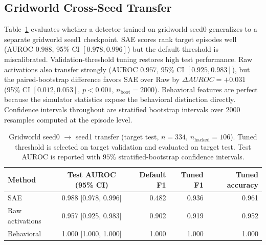 \documentclass[11pt]{article}
\newcommand{\auroc}{AUROC}
\newcommand{\fone}{F1}
\begin{document}
\subsection{Gridworld Cross-Seed Transfer}

Table~\ref{tab:seedtransfer} evaluates whether a detector trained on gridworld seed0 generalizes to a separate gridworld seed1 checkpoint. SAE scores rank target episodes well (\auroc{} $0.988$, 95\% CI $[0.978, 0.996]$) but the default threshold is miscalibrated. Validation-threshold tuning restores high test performance. Raw activations also transfer strongly (\auroc{} $0.957$, 95\% CI $[0.925, 0.983]$), but the paired-bootstrap difference favors SAE over Raw by $\Delta\auroc{} = +0.031$ (95\% CI $[0.012, 0.053]$, $p < 0.001$, $n_{\text{boot}}=2000$). Behavioral features are perfect because the simulator statistics expose the behavioral distinction directly. Confidence intervals throughout are stratified bootstrap intervals over $2000$ resamples computed at the episode level.

\begin{table}[H]
\centering
\caption{Gridworld seed0 $\rightarrow$ seed1 transfer (target test, $n=334$, $n_{\text{hacked}}=106$). Tuned threshold is selected on target validation and evaluated on target test. Test \auroc{} is reported with $95\%$ stratified-bootstrap confidence intervals.}
\label{tab:seedtransfer}
\begin{tabular}{lcrrr}
\toprule
Method & Test \auroc{} (95\% CI) & Default \fone{} & Tuned \fone{} & Tuned accuracy\\
\midrule
SAE             & 0.988 [0.978, 0.996] & 0.482 & 0.936 & 0.961\\
Raw activations & 0.957 [0.925, 0.983] & 0.902 & 0.919 & 0.952\\
Behavioral      & 1.000 [1.000, 1.000] & 1.000 & 1.000 & 1.000\\
\bottomrule
\end{tabular}
\end{table}
\end{document}
